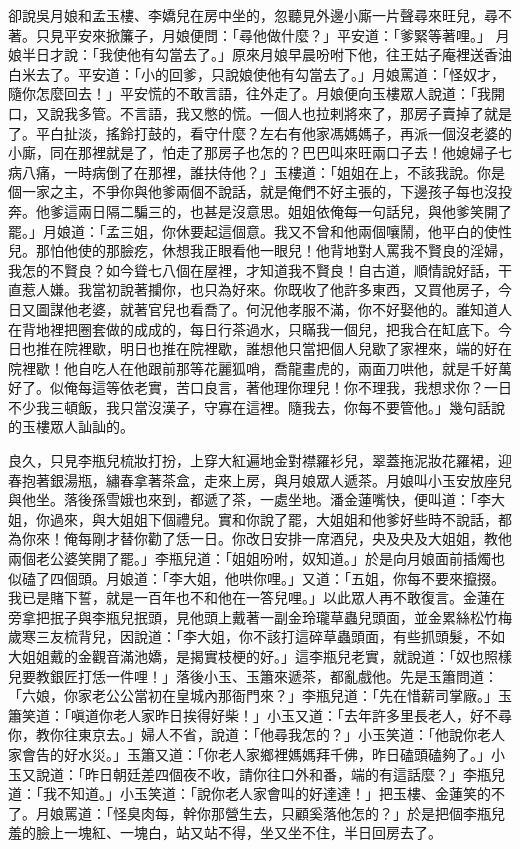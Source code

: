 卻說吳月娘和孟玉樓、李嬌兒在房中坐的，忽聽見外邊小廝一片聲尋來旺兒，尋不著。只見平安來掀簾子，月娘便問：「尋他做什麼？」平安道：「爹緊等著哩。」 月娘半日才說：「我使他有勾當去了。」原來月娘早晨吩咐下他，往王姑子庵裡送香油白米去了。平安道：「小的回爹，只說娘使他有勾當去了。」月娘罵道：「怪奴才，隨你怎麼回去！」平安慌的不敢言語，往外走了。月娘便向玉樓眾人說道：「我開口，又說我多管。不言語，我又憋的慌。一個人也拉剌將來了，那房子賣掉了就是了。平白扯淡，搖鈴打鼓的，看守什麼？左右有他家馮媽媽子，再派一個沒老婆的小廝，同在那裡就是了，怕走了那房子也怎的？巴巴叫來旺兩口子去！他媳婦子七病八痛，一時病倒了在那裡，誰扶侍他？」玉樓道：「姐姐在上，不該我說。你是個一家之主，不爭你與他爹兩個不說話，就是俺們不好主張的，下邊孩子每也沒投奔。他爹這兩日隔二騙三的，也甚是沒意思。姐姐依俺每一句話兒，與他爹笑開了罷。」月娘道：「孟三姐，你休要起這個意。我又不曾和他兩個嚷鬧，他平白的使性兒。那怕他使的那臉疙，休想我正眼看他一眼兒！他背地對人罵我不賢良的淫婦，我怎的不賢良？如今聳七八個在屋裡，才知道我不賢良！自古道，順情說好話，干直惹人嫌。我當初說著攔你，也只為好來。你既收了他許多東西，又買他房子，今日又圖謀他老婆，就著官兒也看喬了。何況他孝服不滿，你不好娶他的。誰知道人在背地裡把圈套做的成成的，每日行茶過水，只瞞我一個兒，把我合在缸底下。今日也推在院裡歇，明日也推在院裡歇，誰想他只當把個人兒歇了家裡來，端的好在院裡歇！他自吃人在他跟前那等花麗狐哨，喬龍畫虎的，兩面刀哄他，就是千好萬好了。似俺每這等依老實，苦口良言，著他理你理兒！你不理我，我想求你？一日不少我三頓飯，我只當沒漢子，守寡在這裡。隨我去，你每不要管他。」幾句話說的玉樓眾人訕訕的。

良久，只見李瓶兒梳妝打扮，上穿大紅遍地金對襟羅衫兒，翠蓋拖泥妝花羅裙，迎春抱著銀湯瓶，繡春拿著茶盒，走來上房，與月娘眾人遞茶。月娘叫小玉安放座兒與他坐。落後孫雪娥也來到，都遞了茶，一處坐地。潘金蓮嘴快，便叫道：「李大姐，你過來，與大姐姐下個禮兒。實和你說了罷，大姐姐和他爹好些時不說話，都為你來！俺每剛才替你勸了恁一日。你改日安排一席酒兒，央及央及大姐姐，教他兩個老公婆笑開了罷。」李瓶兒道：「姐姐吩咐，奴知道。」於是向月娘面前插燭也似磕了四個頭。月娘道：「李大姐，他哄你哩。」又道：「五姐，你每不要來攛掇。我已是賭下誓，就是一百年也不和他在一答兒哩。」以此眾人再不敢復言。金蓮在旁拿把抿子與李瓶兒抿頭，見他頭上戴著一副金玲瓏草蟲兒頭面，並金累絲松竹梅歲寒三友梳背兒，因說道：「李大姐，你不該打這碎草蟲頭面，有些抓頭髮，不如大姐姐戴的金觀音滿池嬌，是揭實枝梗的好。」這李瓶兒老實，就說道：「奴也照樣兒要教銀匠打恁一件哩！」落後小玉、玉簫來遞茶，都亂戲他。先是玉簫問道：「六娘，你家老公公當初在皇城內那衙門來？」李瓶兒道：「先在惜薪司掌廠。」玉簫笑道：「嗔道你老人家昨日挨得好柴！」小玉又道：「去年許多里長老人，好不尋你，教你往東京去。」婦人不省，說道：「他尋我怎的？」小玉笑道：「他說你老人家會告的好水災。」玉簫又道：「你老人家鄉裡媽媽拜千佛，昨日磕頭磕夠了。」小玉又說道：「昨日朝廷差四個夜不收，請你往口外和番，端的有這話麼？」李瓶兒道：「我不知道。」小玉笑道：「說你老人家會叫的好達達！」把玉樓、金蓮笑的不了。月娘罵道：「怪臭肉每，幹你那營生去，只顧奚落他怎的？」於是把個李瓶兒羞的臉上一塊紅、一塊白，站又站不得，坐又坐不住，半日回房去了。

